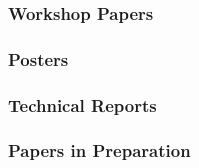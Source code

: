 \subsubsection*{Workshop Papers}
\vspace{-20pt}

\begin{bibunit}[unsrt]
    \nocite{Valtchanov21Parallel}
    \nocite{Das2018EdgeBench}
    \nocite{Goel16Are} %
    \nocite{Assefi15Impact} %
    \nocite{Howard14Cascading}
    \nocite{Harras07ParaNets}
    \putbib[publications]
\end{bibunit}


\subsubsection*{Posters}
\vspace{-20pt}

\begin{bibunit}[unsrt]
    \nocite{Rahman2020MicroLambda}
    \nocite{Goel16HTTP2} %
    \nocite{Bharata13IP2DC:}
    \nocite{Goel13MITATE:}
    \nocite{Howard13Cascading}
    \nocite{Kone10AirLab:a}
    \putbib[publications]
\end{bibunit}


\subsubsection*{Technical Reports}
\vspace{-20pt}

\begin{bibunit}[unsrt]
    \nocite{Mekiker23Cost}
    \nocite{Mekiker2020Beartooth}
    \nocite{Goel2017Domain}
    \nocite{kcclaffy146th}
    \nocite{Kone10AirLab:}
    \putbib[publications]
\end{bibunit}


% 


\subsubsection*{Papers in Preparation}
\vspace{-20pt}

